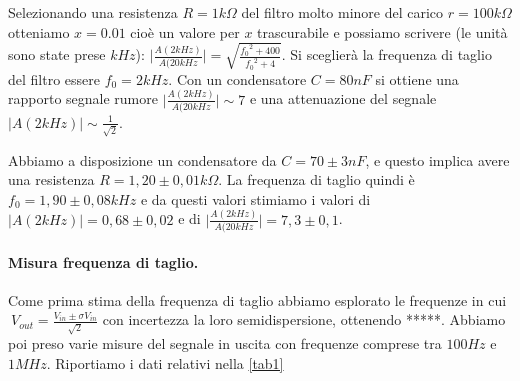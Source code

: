 \documentclass[10pt,a4paper]{article}
\begin{document}
Selezionando una resistenza $R = 1 k\Omega$ del filtro molto minore del carico $r = 100 k\Omega$ otteniamo $x = 0.01$ cioè un valore per $x$ trascurabile e possiamo scrivere (le unità sono state prese $kHz$):
$\vert \frac{A(2 kHz)}{A(20 kHz} \vert = \sqrt{\frac{{f_0}^2  + 400}{{f_0}^2 + 4}}$. Si sceglierà la frequenza di taglio del filtro essere $f_0 = 2kHz$. Con un condensatore $C = 80 nF$ si ottiene una rapporto segnale rumore $\vert \frac{A(2 kHz)}{A(20 kHz} \vert \sim 7$ e una attenuazione del segnale $\vert A(2 kHz) \vert \sim \frac{1}{\sqrt{2}}$.

Abbiamo a disposizione un condensatore da $C =70 \pm3 nF$, e questo implica avere una resistenza $R =1,20 \pm 0,01 k\Omega$.
La frequenza di taglio quindi è $f_0 =1,90 \pm 0,08kHz$ e da questi valori stimiamo i valori di $\vert A(2 kHz) \vert = 0,68\pm0,02 $ e di $\vert \frac{A(2 kHz)}{A(20 kHz} \vert=7,3\pm0,1$.

\paragraph{Misura frequenza di taglio.}
Come prima stima della frequenza di taglio abbiamo esplorato le frequenze in cui $\ V_{out}=\frac{V_{in}\pm\sigma V_{in}}{\sqrt{2}}$ con incertezza la loro semidispersione, ottenendo *****.
Abbiamo poi preso varie misure del segnale in uscita con frequenze comprese tra $100 Hz $ e $1 MHz$.
Riportiamo i dati relativi nella \ref{tab1}
\end{document}
